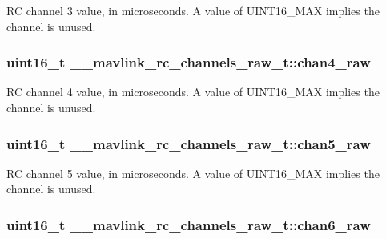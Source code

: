 R\+C channel 3 value, in microseconds. A value of U\+I\+N\+T16\+\_\+\+M\+A\+X implies the channel is unused. 

\hypertarget{struct____mavlink__rc__channels__raw__t_a5c7b02424976def78bae64edb08b4c60}{
\subsubsection[{chan4\+\_\+raw}]{\setlength{\rightskip}{0pt plus 5cm}uint16\+\_\+t \+\_\+\+\_\+mavlink\+\_\+rc\+\_\+channels\+\_\+raw\+\_\+t\+::chan4\+\_\+raw}}\label{struct____mavlink__rc__channels__raw__t_a5c7b02424976def78bae64edb08b4c60}


R\+C channel 4 value, in microseconds. A value of U\+I\+N\+T16\+\_\+\+M\+A\+X implies the channel is unused. 

\hypertarget{struct____mavlink__rc__channels__raw__t_add8ae2761f8b65c92d0d2cc4f2e836fd}{
\subsubsection[{chan5\+\_\+raw}]{\setlength{\rightskip}{0pt plus 5cm}uint16\+\_\+t \+\_\+\+\_\+mavlink\+\_\+rc\+\_\+channels\+\_\+raw\+\_\+t\+::chan5\+\_\+raw}}\label{struct____mavlink__rc__channels__raw__t_add8ae2761f8b65c92d0d2cc4f2e836fd}


R\+C channel 5 value, in microseconds. A value of U\+I\+N\+T16\+\_\+\+M\+A\+X implies the channel is unused. 

\hypertarget{struct____mavlink__rc__channels__raw__t_a4f2114cbf6637d9b0c661f08d54c9958}{
\subsubsection[{chan6\+\_\+raw}]{\setlength{\rightskip}{0pt plus 5cm}uint16\+\_\+t \+\_\+\+\_\+mavlink\+\_\+rc\+\_\+channels\+\_\+raw\+\_\+t\+::chan6\+\_\+raw}}\label{struct____mavlink__rc__channels__raw__t_a4f2114cbf6637d9b0c661f08d54c9958}


